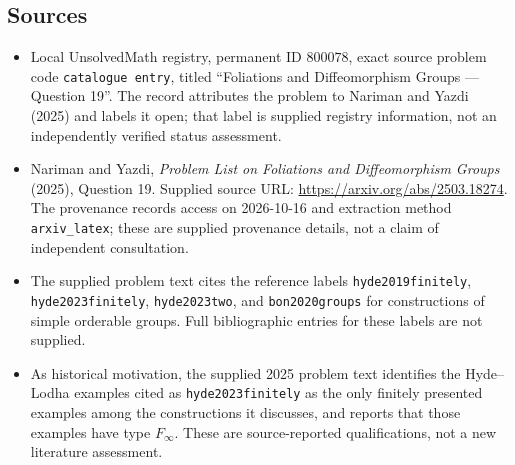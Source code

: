 \documentclass[11pt]{article}
\begin{document}
\subsection{Sources}
\begin{itemize}
\item Local UnsolvedMath registry, permanent ID \(800078\), exact source problem code \texttt{catalogue entry}, titled ``Foliations and Diffeomorphism Groups --- Question 19''. The record attributes the problem to Nariman and Yazdi (2025) and labels it open; that label is supplied registry information, not an independently verified status assessment.
\item Nariman and Yazdi, \emph{Problem List on Foliations and Diffeomorphism Groups} (2025), Question 19. Supplied source URL: \url{https://arxiv.org/abs/2503.18274}. The provenance records access on 2026-10-16 and extraction method \texttt{arxiv\_latex}; these are supplied provenance details, not a claim of independent consultation.
\item The supplied problem text cites the reference labels \texttt{hyde2019finitely}, \texttt{hyde2023finitely}, \texttt{hyde2023two}, and \texttt{bon2020groups} for constructions of simple orderable groups. Full bibliographic entries for these labels are not supplied.
\item As historical motivation, the supplied 2025 problem text identifies the Hyde--Lodha examples cited as \texttt{hyde2023finitely} as the only finitely presented examples among the constructions it discusses, and reports that those examples have type \(F_\infty\). These are source-reported qualifications, not a new literature assessment.
\end{itemize}
\end{document}
